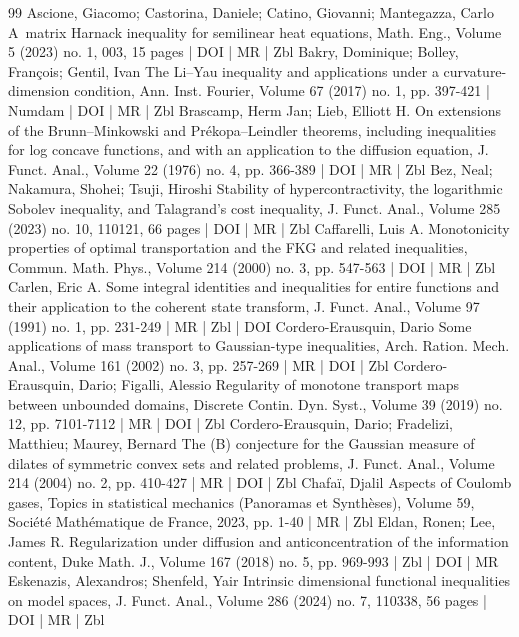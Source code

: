 \begin{thebibliography}{99}
 Ascione, Giacomo; Castorina, Daniele; Catino, Giovanni; Mantegazza, Carlo A matrix Harnack inequality for semilinear heat equations, Math. Eng., Volume 5 (2023) no. 1, 003, 15 pages | DOI | MR | Zbl
 Bakry, Dominique; Bolley, François; Gentil, Ivan The Li–Yau inequality and applications under a curvature-dimension condition, Ann. Inst. Fourier, Volume 67 (2017) no. 1, pp. 397-421 | Numdam | DOI | MR | Zbl
 Brascamp, Herm Jan; Lieb, Elliott H. On extensions of the Brunn–Minkowski and Prékopa–Leindler theorems, including inequalities for log concave functions, and with an application to the diffusion equation, J. Funct. Anal., Volume 22 (1976) no. 4, pp. 366-389 | DOI | MR | Zbl
 Bez, Neal; Nakamura, Shohei; Tsuji, Hiroshi Stability of hypercontractivity, the logarithmic Sobolev inequality, and Talagrand’s cost inequality, J. Funct. Anal., Volume 285 (2023) no. 10, 110121, 66 pages | DOI | MR | Zbl
 Caffarelli, Luis A. Monotonicity properties of optimal transportation and the FKG and related inequalities, Commun. Math. Phys., Volume 214 (2000) no. 3, pp. 547-563 | DOI | MR | Zbl
 Carlen, Eric A. Some integral identities and inequalities for entire functions and their application to the coherent state transform, J. Funct. Anal., Volume 97 (1991) no. 1, pp. 231-249 | MR | Zbl | DOI
 Cordero-Erausquin, Dario Some applications of mass transport to Gaussian-type inequalities, Arch. Ration. Mech. Anal., Volume 161 (2002) no. 3, pp. 257-269 | MR | DOI | Zbl
 Cordero-Erausquin, Dario; Figalli, Alessio Regularity of monotone transport maps between unbounded domains, Discrete Contin. Dyn. Syst., Volume 39 (2019) no. 12, pp. 7101-7112 | MR | DOI | Zbl
 Cordero-Erausquin, Dario; Fradelizi, Matthieu; Maurey, Bernard The (B) conjecture for the Gaussian measure of dilates of symmetric convex sets and related problems, J. Funct. Anal., Volume 214 (2004) no. 2, pp. 410-427 | MR | DOI | Zbl
 Chafaï, Djalil Aspects of Coulomb gases, Topics in statistical mechanics (Panoramas et Synthèses), Volume 59, Société Mathématique de France, 2023, pp. 1-40 | MR | Zbl
 Eldan, Ronen; Lee, James R. Regularization under diffusion and anticoncentration of the information content, Duke Math. J., Volume 167 (2018) no. 5, pp. 969-993 | Zbl | DOI | MR
 Eskenazis, Alexandros; Shenfeld, Yair Intrinsic dimensional functional inequalities on model spaces, J. Funct. Anal., Volume 286 (2024) no. 7, 110338, 56 pages | DOI | MR | Zbl

\end{thebibliography}
